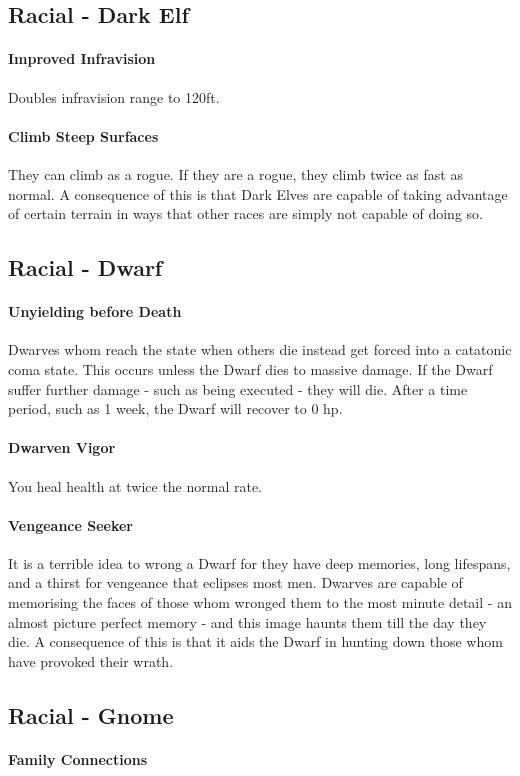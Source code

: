 \subsection{Racial - Dark Elf}
    \paragraph{Improved Infravision} Doubles infravision range to 120ft.
    \paragraph{Climb Steep Surfaces} They can climb as a rogue. If they are a rogue, they climb twice as fast as normal. A consequence of this is that Dark Elves are capable of taking advantage of certain terrain in ways that other races are simply not capable of doing so.
\subsection{Racial - Dwarf}
    \paragraph{Unyielding before Death} Dwarves whom reach the state when others die instead get forced into a catatonic coma state. This occurs unless the Dwarf dies to massive damage. If the Dwarf suffer further damage - such as being executed - they will die. After a time period, such as 1 week, the Dwarf will recover to 0 hp.  
    \paragraph{Dwarven Vigor} You heal health at twice the normal rate. 
    \paragraph{Vengeance Seeker} It is a terrible idea to wrong a Dwarf for they have deep memories, long lifespans, and a thirst for vengeance that eclipses most men. Dwarves are capable of memorising the faces of those whom wronged them to the most minute detail - an almost picture perfect memory - and this image haunts them till the day they die. A consequence of this is that it aids the Dwarf in hunting down those whom have provoked their wrath. 
\subsection{Racial - Gnome} 
    \paragraph{Family Connections}

